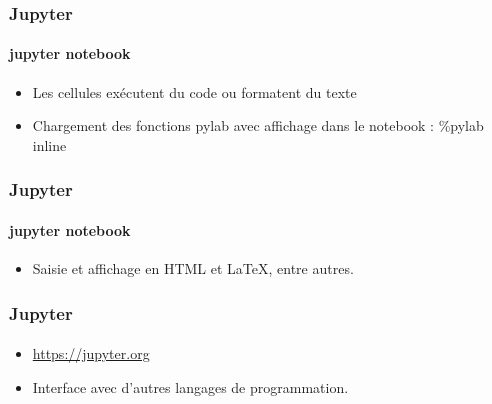 \begin{frame}[fragile]
\frametitle{Jupyter}
\framesubtitle{jupyter notebook}
\begin{itemize}
 \item Les cellules exécutent du code ou formatent du texte
 \item Chargement des fonctions pylab avec affichage dans le notebook : \%pylab inline 
\end{itemize}
\begin{center}
\end{center}
\end{frame}
\begin{frame}[fragile]
\frametitle{Jupyter}
\framesubtitle{jupyter notebook}
\begin{itemize}
 \item Saisie et affichage en HTML et LaTeX, entre autres.   
\end{itemize}
\begin{center}
\end{center}
\end{frame}
\begin{frame}[fragile]
\frametitle{Jupyter}
\framesubtitle{}
\begin{itemize}
 \item \url{https://jupyter.org}
 \item Interface avec d'autres langages de programmation.  
\end{itemize}
\begin{center}
\end{center}
\end{frame}
